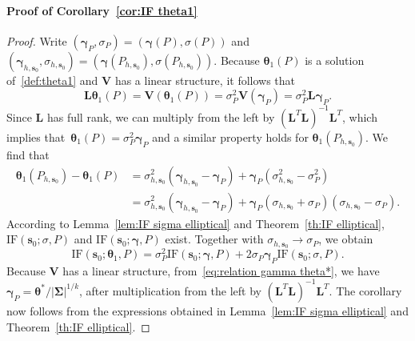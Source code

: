 \documentclass{article}
\numberwithin{equation}{section}
\theoremstyle{plain}
\newcommand{\btheta}{\bm\theta}
\newcommand{\bgamma}{\bm\gamma}
\newcommand{\bSigma}{\mathbf{\Sigma}}
\newcommand{\bs}{\mathbf{s}}
\newcommand{\bV}{\mathbf{V}}
\newcommand{\bL}{\mathbf{L}}
\begin{document}
\paragraph*{Proof of Corollary~\ref{cor:IF theta1}}
\begin{proof}
Write $(\bgamma_P,\sigma_P)=(\bgamma(P),\sigma(P))$
and $(\bgamma_{h,\bs_0},\sigma_{h,\bs_0})=(\bgamma(P_{h,\bs_0}),\sigma(P_{h,\bs_0}))$.
Because $\btheta_1(P)$ is a solution of~\eqref{def:theta1} and
$\bV$ has a linear structure, it follows that
\begin{equation}
\label{eq:relation theta1 gamma}
\bL\btheta_1(P)
=
\bV(\btheta_1(P))
=
\sigma^2_P\bV(\bgamma_P)
=
\sigma^2_P\bL\bgamma_P.
\end{equation}
Since $\bL$ has full rank, we can multiply from the left by $(\bL^T\bL)^{-1}\bL^T$,
which implies that~$\btheta_1(P)=\sigma^2_P\bgamma_P$ and 
a similar property holds for $\btheta_1(P_{h,\bs_0})$.
We find that
\[
\begin{split}
\btheta_1(P_{h,\bs_0})-\btheta_1(P)
&= 
\sigma^2_{h,\bs_0}
\left(
\bgamma_{h,\bs_0}-\bgamma_P
\right)
+
\bgamma_P
\left(
\sigma^2_{h,\bs_0}-\sigma^2_P
\right)\\
&=
\sigma^2_{h,\bs_0}
\left(
\bgamma_{h,\bs_0}-\bgamma_P
\right)
+
\bgamma_P
\left(
\sigma_{h,\bs_0}+\sigma_P
\right)
\left(
\sigma_{h,\bs_0}-\sigma_P
\right).
\end{split}
\]
According to Lemma~\ref{lem:IF sigma elliptical} and Theorem~\ref{th:IF elliptical},
$\text{IF}(\bs_0;\sigma,P)$ and $\text{IF}(\bs_0;\bgamma,P)$ exist.
Together with $\sigma_{h,\bs_0}\to\sigma_P$, we obtain
\[
\text{IF}(\bs_0;\btheta_1,P)
=
\sigma^2_P
\text{IF}(\bs_0;\bgamma,P)
+
2\sigma_P\bgamma_P
\text{IF}(\bs_0;\sigma,P).
\]
Because $\bV$ has a linear structure, from~\eqref{eq:relation gamma theta*},
we have $\bgamma_P=\btheta^*/|\bSigma|^{1/k}$,
after multiplication from the left by $(\bL^T\bL)^{-1}\bL^T$.
The corollary now follows from the expressions obtained in Lemma~\ref{lem:IF sigma elliptical} and Theorem~\ref{th:IF elliptical}.
\end{proof}
\end{document}
